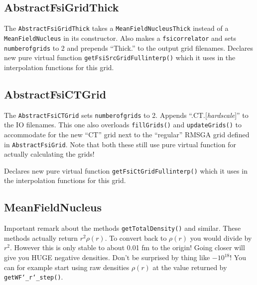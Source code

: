 \subsection{AbstractFsiGridThick}
The \texttt{AbstractFsiGridThick} takes a \texttt{MeanFieldNucleusThick} instead of a \texttt{MeanFieldNucleus} in its constructor. Also makes a \texttt{fsicorrelator} and sets \texttt{number\textunderscore of\textunderscore grids} to 2 and prepends ``Thick.'' to the output grid filenames.
Declares new pure virtual function \texttt{getFsiSrcGridFull\textunderscore interp()} which it uses in the interpolation functions for this grid.

\subsection{AbstractFsiCTGrid}
The \texttt{AbstractFsiCTGrid} sets \texttt{number\textunderscore of\textunderscore grids} to 2. Appends ``.CT.[\textit{hardscale}]'' to the IO filenames.
This one also overloads \texttt{fillGrids()} and \texttt{updateGrids()} to accommodate for the new ``CT'' grid next to the ``regular'' RMSGA grid defined in \texttt{AbstractFsiGrid}. Note that both these still use pure virtual function for actually calculating the grids!

Declares new pure virtual function \texttt{getFsiCtGridFull\textunderscore interp()} which it uses in the interpolation functions for this grid.

\subsection{MeanFieldNucleus}
Important remark about the methods \texttt{getTotalDensity()} and similar. These methods actually return $r^{2} \rho(r)$. To convert back to $\rho(r)$ you would divide by $r^{2}$. However this is only stable to about 0.01 fm to the origin! Going closer will give you \large{HUGE} negative densities. Don't be surprised by thing like $-10^{18}$! You can for example start using raw densities $\rho(r)$ at the value returned by \texttt{getWF\char`_r\char`_step()}.